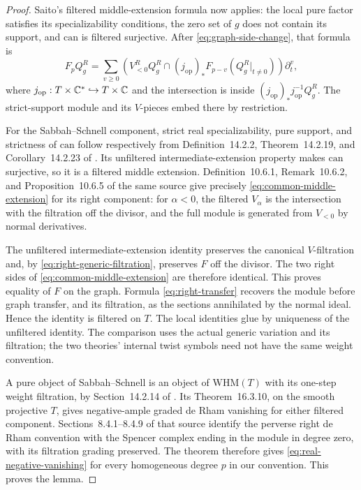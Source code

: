 \begin{proof}
Saito's filtered middle-extension formula
\cite[equation~(1.7.2)]{Saito1990Kahler} now applies: the local pure
factor satisfies its specializability conditions, the zero set of \(g\)
does not contain its support, and \(\mathrm{can}\) is filtered
surjective.  After \eqref{eq:graph-side-change}, that formula is
\begin{equation}\label{eq:common-middle-extension}
 F_pQ_g^R=
 \sum_{v\geq0}
 \left(V^R_{<0}Q_g^R\cap
 (j_{\mathrm{op}})_*F_{p-v}(Q_g^R|_{t\ne0})\right)\partial_t^v,
\end{equation}
where \(j_{\mathrm{op}}:T\times\mathbb C^*\hookrightarrow T\times\mathbb C\) and the
intersection is inside \((j_{\mathrm{op}})_*j_{\mathrm{op}}^{-1}Q_g^R\).
The strict-support module and its \(V\)-pieces embed there by restriction.

For the Sabbah--Schnell component, strict real specializability, pure
support, and strictness of \(\mathrm{can}\) follow respectively from
Definition~14.2.2, Theorem~14.2.19, and Corollary~14.2.23 of
\cite{SabbahSchnell2026}.  Its unfiltered intermediate-extension property
makes \(\mathrm{can}\) surjective, so it is a filtered middle extension.
Definition~10.6.1, Remark~10.6.2, and Proposition~10.6.5 of the same
source give precisely \eqref{eq:common-middle-extension} for its right
component: for \(\alpha<0\), the filtered \(V_\alpha\) is the
intersection with the filtration off the divisor, and the full module
is generated from \(V_{<0}\) by normal derivatives.

The unfiltered intermediate-extension identity preserves the canonical
\(V\)-filtration and, by \eqref{eq:right-generic-filtration}, preserves
\(F\) off the divisor.  The two right sides of
\eqref{eq:common-middle-extension} are therefore identical.  This proves
equality of \(F\) on the graph.  Formula \eqref{eq:right-transfer}
recovers the module before graph transfer, and its filtration, as the
sections annihilated by the normal ideal.  Hence the identity is filtered
on \(T\).  The local identities glue by uniqueness of the unfiltered
identity.  The comparison uses the actual generic variation
and its filtration; the two theories' internal twist symbols need not
have the same weight convention.

A pure object of Sabbah--Schnell is an object of \(\mathrm{WHM}(T)\)
with its one-step weight filtration, by Section~14.2.14 of
\cite{SabbahSchnell2026}.  Its Theorem~16.3.10, on the smooth projective
\(T\), gives negative-ample graded de Rham vanishing for either filtered
component.  Sections~8.4.1--8.4.9 of that source identify the perverse
right de Rham convention with the Spencer complex ending in the module
in degree zero, with its filtration grading preserved.  The theorem
therefore gives \eqref{eq:real-negative-vanishing} for every homogeneous
degree \(p\) in our convention.  This proves the lemma.
\end{proof}

